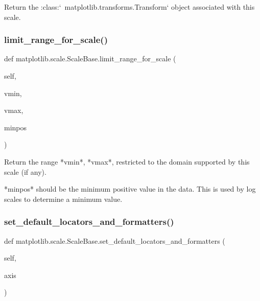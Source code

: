 \begin{DoxyVerb}Return the :class:`~matplotlib.transforms.Transform` object
associated with this scale.
\end{DoxyVerb}
 \mbox{\label{classmatplotlib_1_1scale_1_1ScaleBase_ad39a31685b8be84d28b9f257ab94569b}} 
\subsubsection{\texorpdfstring{limit\+\_\+range\+\_\+for\+\_\+scale()}{limit\_range\_for\_scale()}}
{\footnotesize\ttfamily def matplotlib.\+scale.\+Scale\+Base.\+limit\+\_\+range\+\_\+for\+\_\+scale (\begin{DoxyParamCaption}\item[{}]{self,  }\item[{}]{vmin,  }\item[{}]{vmax,  }\item[{}]{minpos }\end{DoxyParamCaption})}

\begin{DoxyVerb}Return the range *vmin*, *vmax*, restricted to the
domain supported by this scale (if any).

*minpos* should be the minimum positive value in the data.
This is used by log scales to determine a minimum value.
\end{DoxyVerb}
 \mbox{\label{classmatplotlib_1_1scale_1_1ScaleBase_aa483d098bc7dfb64f6b9e799c14f377a}} 
\subsubsection{\texorpdfstring{set\+\_\+default\+\_\+locators\+\_\+and\+\_\+formatters()}{set\_default\_locators\_and\_formatters()}}
{\footnotesize\ttfamily def matplotlib.\+scale.\+Scale\+Base.\+set\+\_\+default\+\_\+locators\+\_\+and\+\_\+formatters (\begin{DoxyParamCaption}\item[{}]{self,  }\item[{}]{axis }\end{DoxyParamCaption})}

